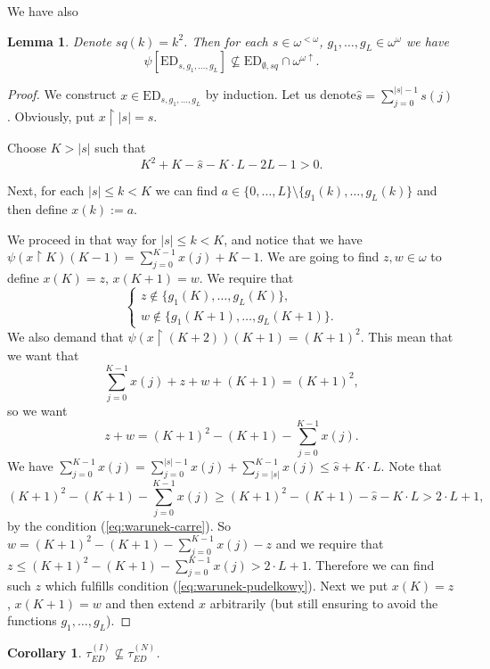 \documentclass[12pt]{amsart}
\theoremstyle{plain}
\newtheorem{lemma}[theorem]{Lemma}
\newtheorem{corollary}[theorem]{Corollary}
\theoremstyle{definition}
\theoremstyle{remark}
\newcommand{\baire}{\omega^{\omega}}
\newcommand{\finbaire}{\omega^{<\omega}}
\newcommand{\incrbaire}{\omega^{\omega \uparrow}}
\newcommand{\EventuallyDifferent}[2]{\mathrm{ED}_{#1,#2}}
\newcommand{\EventuallyDifferentNative}{\tau_{\mathit{ED}}^{(N)}}
\newcommand{\EventuallyDifferentInduced}{\tau_{\mathit{ED}}^{(I)}}
\newcommand{\carre}{\mathit{sq}}
\begin{document}
We have also
\begin{lemma}
  Denote $\carre(k) = k^2$. Then
for each $s \in \finbaire$, $g_1,\ldots, g_L \in \baire$
we have
\[
  \psi [\EventuallyDifferent{s}{g_1, \ldots, g_L}]
  \not\subseteq \EventuallyDifferent{\emptyset}{\carre}\cap\incrbaire.
\]
\end{lemma}
\begin{proof}
  We construct $x \in \EventuallyDifferent{s}{g_1, \ldots, g_L}$ by induction.
  Let us denote\linebreak $\hat{s} = \sum_{j=0}^{|s| - 1} s(j)$.
  Obviously, put $x \restriction |s| = s$.

  Choose $K > |s|$ such that
  \begin{equation}\label{eq:warunek-carre}
  K^2 + K - \hat{s} - K\cdot L - 2L - 1 > 0.
  \end{equation}

  Next, for
  each $|s| \leq k < K$ we can find
  $a \in \lbrace 0, \ldots, L\rbrace \setminus \lbrace g_1(k), \ldots, g_L(k)\rbrace$
  and then define $x(k) := a$.

  We proceed in that way for $|s| \leq k < K$,
  and notice that we have
  $\psi(x\restriction K)(K - 1) = \sum_{j=0}^{K-1} x(j) + K - 1$.
  We are going to find $z, w \in \omega$ to define
  $x(K) = z$, $x(K + 1) = w$.
  We require that
  \begin{equation}\label{eq:warunek-pudelkowy}
    \begin{cases}
      z \not\in \lbrace g_1(K),\ldots, g_L(K)\rbrace,\\
      w \not\in \lbrace g_1(K + 1),\ldots, g_L(K + 1)\rbrace.
     \end{cases}
  \end{equation}
  We also demand that
  $\psi(x \restriction (K + 2)) (K + 1) = (K + 1)^2$.
  This mean that we want that
  \[
   \sum_{j = 0}^{K - 1} x(j) + z + w + (K + 1) = (K + 1)^2,
  \]
  so we want
  \[
    z + w = (K + 1)^2 - (K + 1) - \sum_{j = 0}^{K - 1} x(j).
  \]
  We have
  $\sum_{j = 0}^{K - 1} x(j) = \sum_{j = 0}^{|s| - 1} x(j) +  \sum_{j = |s|}^{K - 1} x(j)
  \leq \hat{s} + K \cdot L$.
  Note that
\[
  (K + 1)^2 - (K + 1) - \sum_{j = 0}^{K - 1} x(j) \geq
  (K + 1)^2 - (K + 1) - \hat{s} - K \cdot L > 2\cdot L + 1,
\]
by the condition (\ref{eq:warunek-carre}).
So $w = (K + 1)^2 - (K + 1) - \sum_{j = 0}^{K - 1} x(j) - z$
and we require that $z \leq  (K + 1)^2 - (K + 1) - \sum_{j = 0}^{K - 1} x(j) > 2 \cdot L + 1$.
Therefore we can find such $z$ which fulfills condition (\ref{eq:warunek-pudelkowy}).
Next we put $x(K) = z$, $x(K + 1) = w$ and then extend $x$ arbitrarily
(but still ensuring to avoid the functions $g_1, \ldots, g_L$).
\end{proof}
\begin{corollary}
$\EventuallyDifferentInduced \not\subseteq \EventuallyDifferentNative$.
\end{corollary}
\end{document}
